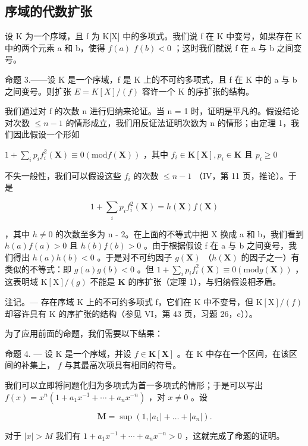 \subsection{序域的代数扩张}

设 K 为一个序域，且 f 为 K{[}X{]} 中的多项式。我们说 f 在 K 中变号，如果存在 K 中的两个元素 a 和 b，使得 \(f(a)\) \(f(b) < 0\) ；这时我们就说 f 在 a 与 b 之间变号。

命题 3.——设 K 是一个序域，f 是 K 上的不可约多项式，且 f 在 K 中的 a 与 b 之间变号。则扩张 \(E = K[X]/(f)\) 容许一个 K 的序扩张的结构。

我们通过对 f 的次数 n 进行归纳来论证。当 n = 1 时，证明是平凡的。假设结论对次数 \(\leqslant n - 1\) 的情形成立，我们用反证法证明次数为 n 的情形；由定理 1，我们因此假设一个形如

\(1 + \sum_{i}p_{i}f_{i}^{2}(\mathbf{X})\equiv 0 (\mathrm{mod} f(\mathbf{X}))\) ，其中 \(f_{i}\in \mathbf{K}[\mathbf{X}], p_{i}\in \mathbf{K}\) 且 \(p_i\geqslant 0\)

不失一般性，我们可以假设这些 \(f_{i}\) 的次数 \(\leqslant n - 1\) （IV，第 11 页，推论）。于是

\[
1 + \sum_ {i} p _ {i} f _ {i} ^ {2} (\mathbf {X}) = h (\mathbf {X}) f (\mathbf {X})
\]

，其中 \(h \neq 0\) 的次数至多为 n - 2。在上面的不等式中把 X 换成 a 和 b，我们看到 \(h(a) f(a) > 0\) 且 \(h(b) f(b) > 0\) 。由于根据假设 f 在 a 与 b 之间变号，我们得出 \(h(a) h(b) < 0\) 。于是对不可约因子 \(g(\mathbf{X})\) （\(h(\mathbf{X})\) 的因子之一）有类似的不等式：即 \(g(a)g(b) < 0\) 。但 \(1 + \sum_{i}p_{i}f_{i}^{2}(\mathbf{X})\equiv 0 (\mathrm{mod} g(\mathbf{X}))\) ，这表明域 \(\mathrm{K}[\mathrm{X}] / (g)\) 不能是 \(\mathbf{K}\) 的序扩张（定理 1），与归纳假设相矛盾。

注记。--- 存在序域 K 上的不可约多项式 f，它们在 K 中不变号，但 \(\mathrm{K}[\mathrm{X}]/(f)\) 却容许具有 K 的序扩张的结构（参见 VI，第 43 页，习题 26，c））。

为了应用前面的命题，我们需要以下结果：

命题 4. --- 设 K 是一个序域，并设 \(f \in \mathbf{K}[\mathbf{X}]\) 。在 K 中存在一个区间，在该区间的补集上， \(f\) 与其最高次项具有相同的符号。

我们可以立即将问题化归为多项式为首一多项式的情形；于是可以写出 \(f(x) = x^{n}(1 + a_{1}x^{-1} + \cdots + a_{n}x^{-n})\) ，对 \(x \neq 0\) 。设

\[
\mathbf {M} = \sup \left(1, | a _ {1} | + \dots + | a _ {n} |\right).
\]

对于 \(|x| > M\) 我们有 \(1 + a_{1}x^{-1} + \cdots + a_{n}x^{-n} > 0\) ，这就完成了命题的证明。

